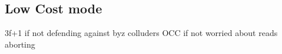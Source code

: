 \subsection{Low Cost mode}
3f+1 if not defending against byz colluders
OCC if not worried about reads aborting

